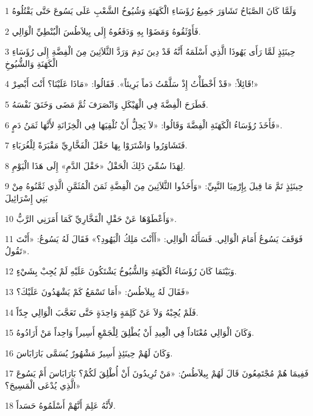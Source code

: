 \par 1 وَلَمَّا كَانَ الصَّبَاحُ تَشَاوَرَ جَمِيعُ رُؤَسَاءِ الْكَهَنَةِ وَشُيُوخُ الشَّعْبِ عَلَى يَسُوعَ حَتَّى يَقْتُلُوهُ
\par 2 فَأَوْثَقُوهُ وَمَضَوْا بِهِ وَدَفَعُوهُ إِلَى بِيلاَطُسَ الْبُنْطِيِّ الْوَالِي.
\par 3 حِينَئِذٍ لَمَّا رَأَى يَهُوذَا الَّذِي أَسْلَمَهُ أَنَّهُ قَدْ دِينَ نَدِمَ وَرَدَّ الثَّلاَثِينَ مِنَ الْفِضَّةِ إِلَى رُؤَسَاءِ الْكَهَنَةِ وَالشُّيُوخِ
\par 4 قَائِلاً: «قَدْ أَخْطَأْتُ إِذْ سَلَّمْتُ دَماً بَرِيئاً». فَقَالُوا: «مَاذَا عَلَيْنَا؟ أَنْتَ أَبْصِرْ!»
\par 5 فَطَرَحَ الْفِضَّةَ فِي الْهَيْكَلِ وَانْصَرَفَ ثُمَّ مَضَى وَخَنَقَ نَفْسَهُ.
\par 6 فَأَخَذَ رُؤَسَاءُ الْكَهَنَةِ الْفِضَّةَ وَقَالُوا: «لاَ يَحِلُّ أَنْ نُلْقِيَهَا فِي الْخِزَانَةِ لأَنَّهَا ثَمَنُ دَمٍ».
\par 7 فَتَشَاوَرُوا وَاشْتَرَوْا بِهَا حَقْلَ الْفَخَّارِيِّ مَقْبَرَةً لِلْغُرَبَاءِ.
\par 8 لِهَذَا سُمِّيَ ذَلِكَ الْحَقْلُ «حَقْلَ الدَّمِ» إِلَى هَذَا الْيَوْمِ.
\par 9 حِينَئِذٍ تَمَّ مَا قِيلَ بِإِرْمِيَا النَّبِيِّ: «وَأَخَذُوا الثَّلاَثِينَ مِنَ الْفِضَّةِ ثَمَنَ الْمُثَمَّنِ الَّذِي ثَمَّنُوهُ مِنْ بَنِي إِسْرَائِيلَ
\par 10 وَأَعْطَوْهَا عَنْ حَقْلِ الْفَخَّارِيِّ كَمَا أَمَرَنِي الرَّبُّ».
\par 11 فَوَقَفَ يَسُوعُ أَمَامَ الْوَالِي. فَسَأَلَهُ الْوَالِي: «أَأَنْتَ مَلِكُ الْيَهُودِ؟» فَقَالَ لَهُ يَسُوعُ: «أَنْتَ تَقُولُ».
\par 12 وَبَيْنَمَا كَانَ رُؤَسَاءُ الْكَهَنَةِ وَالشُّيُوخُ يَشْتَكُونَ عَلَيْهِ لَمْ يُجِبْ بِشَيْءٍ.
\par 13 فَقَالَ لَهُ بِيلاَطُسُ: «أَمَا تَسْمَعُ كَمْ يَشْهَدُونَ عَلَيْكَ؟»
\par 14 فَلَمْ يُجِبْهُ وَلاَ عَنْ كَلِمَةٍ وَاحِدَةٍ حَتَّى تَعَجَّبَ الْوَالِي جِدّاً.
\par 15 وَكَانَ الْوَالِي مُعْتَاداً فِي الْعِيدِ أَنْ يُطْلِقَ لِلْجَمْعِ أَسِيراً وَاحِداً مَنْ أَرَادُوهُ.
\par 16 وَكَانَ لَهُمْ حِينَئِذٍ أَسِيرٌ مَشْهُورٌ يُسَمَّى بَارَابَاسَ.
\par 17 فَفِيمَا هُمْ مُجْتَمِعُونَ قَالَ لَهُمْ بِيلاَطُسُ: «مَنْ تُرِيدُونَ أَنْ أُطْلِقَ لَكُمْ؟ بَارَابَاسَ أَمْ يَسُوعَ الَّذِي يُدْعَى الْمَسِيحَ؟»
\par 18 لأَنَّهُ عَلِمَ أَنَّهُمْ أَسْلَمُوهُ حَسَداً.
